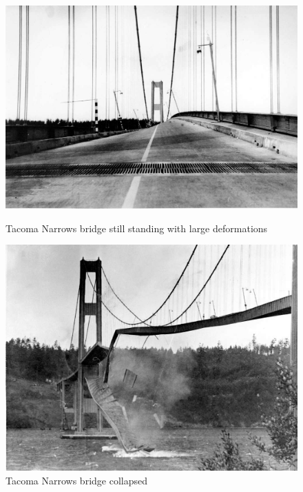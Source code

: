 \begin{figure}
\centering
\begin{minipage}{.51\textwidth}
  \centering
  \includegraphics[width=.95\linewidth]{./IntroductionToFSI/tacoma2.jpeg}
  \caption{Tacoma Narrows bridge still standing with large deformations}
  \label{fig:test1}
\end{minipage}%
\begin{minipage}{.50\textwidth}
  \centering
  \includegraphics[width=.95\linewidth]{./IntroductionToFSI/tacoma3.jpeg}
  \caption{Tacoma Narrows bridge collapsed}
  \label{fig:test2}
\end{minipage}
\end{figure}

